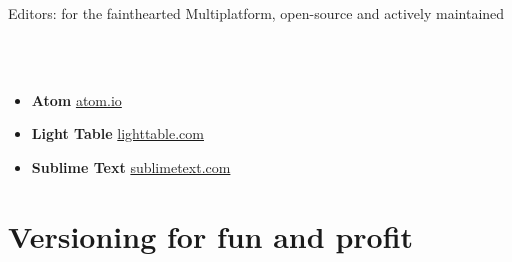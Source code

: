 \documentclass[10pt]{beamer}
\begin{document}
\begin{frame}[t]{Editors: for the fainthearted} %
  \Large
  Multiplatform, open-source and actively maintained

  \\~\\

  \begin{itemize}
  \item \textbf{Atom} \hfill \url{atom.io}
  \item \textbf{Light Table} \hfill \url{lighttable.com}
  \item \textbf{Sublime Text} \hfill \url{sublimetext.com}
  \end{itemize}
\end{frame}

\section{Versioning for fun and profit} %
\end{document}
